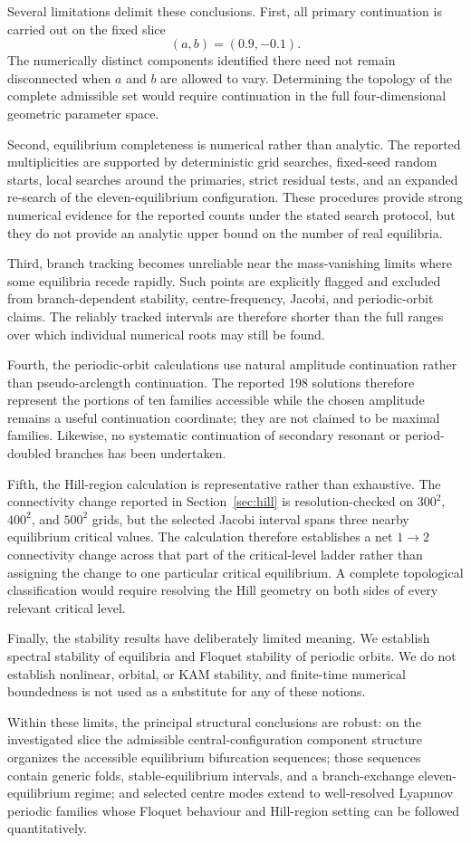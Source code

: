 Several limitations delimit these conclusions. First, all primary
continuation is carried out on the fixed slice
\[
(a,b)=(0.9,-0.1).
\]
The numerically distinct components identified there need not remain
disconnected when $a$ and $b$ are allowed to vary. Determining the topology
of the complete admissible set would require continuation in the full
four-dimensional geometric parameter space.

Second, equilibrium completeness is numerical rather than analytic. The
reported multiplicities are supported by deterministic grid searches,
fixed-seed random starts, local searches around the primaries, strict
residual tests, and an expanded re-search of the eleven-equilibrium
configuration. These procedures provide strong numerical evidence for the
reported counts under the stated search protocol, but they do not provide
an analytic upper bound on the number of real equilibria.

Third, branch tracking becomes unreliable near the mass-vanishing limits
where some equilibria recede rapidly. Such points are explicitly flagged
and excluded from branch-dependent stability, centre-frequency, Jacobi,
and periodic-orbit claims. The reliably tracked intervals are therefore
shorter than the full ranges over which individual numerical roots may
still be found.

Fourth, the periodic-orbit calculations use natural amplitude continuation
rather than pseudo-arclength continuation. The reported 198 solutions
therefore represent the portions of ten families accessible while the
chosen amplitude remains a useful continuation coordinate; they are not
claimed to be maximal families. Likewise, no systematic continuation of
secondary resonant or period-doubled branches has been undertaken.

Fifth, the Hill-region calculation is representative rather than
exhaustive. The connectivity change reported in Section~\ref{sec:hill} is
resolution-checked on $300^2$, $400^2$, and $500^2$ grids, but the selected
Jacobi interval spans three nearby equilibrium critical values. The
calculation therefore establishes a net $1\rightarrow2$ connectivity
change across that part of the critical-level ladder rather than assigning
the change to one particular critical equilibrium. A complete topological
classification would require resolving the Hill geometry on both sides of
every relevant critical level.

Finally, the stability results have deliberately limited meaning. We
establish spectral stability of equilibria and Floquet stability of
periodic orbits. We do not establish nonlinear, orbital, or KAM stability,
and finite-time numerical boundedness is not used as a substitute for any
of these notions.

Within these limits, the principal structural conclusions are robust: on
the investigated slice the admissible central-configuration component
structure organizes the accessible equilibrium bifurcation sequences;
those sequences contain generic folds, stable-equilibrium intervals, and a
branch-exchange eleven-equilibrium regime; and selected centre modes extend
to well-resolved Lyapunov periodic families whose Floquet behaviour and
Hill-region setting can be followed quantitatively.
